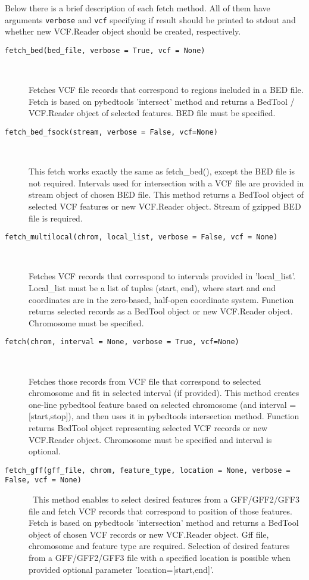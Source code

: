 \noindent Below there is a brief description of each fetch method.
All of them have arguments \verb|verbose| and \verb|vcf| specifying if result should be printed to stdout
and whether new VCF.Reader object should be created, respectively.

\begin{description}
  \item[\texttt{fetch\_bed(bed\_file, verbose = True, vcf = None)}] \

    Fetches VCF file records that correspond to regions included in a BED file.
    Fetch is based on pybedtools 'intersect' method and returns a BedTool / VCF.Reader object of selected features.
    BED file must be specified.

  \item[\texttt{fetch\_bed\_fsock(stream, verbose = False, vcf=None)}] \

    This fetch works exactly the same as fetch\_bed(), except the BED file is not required.
    Intervals used for intersection with a VCF file are provided in stream object of chosen BED file.
    This method returns a BedTool object of selected VCF features or new VCF.Reader object.
    Stream of gzipped BED file is required.

  \item[\texttt{fetch\_multilocal(chrom, local\_list, verbose = False, vcf = None)}] \

    Fetches VCF records that correspond to intervals provided in 'local\_list'.
    Local\_list must be a list of tuples (start, end), where start and end coordinates are in the
    zero-based, half-open coordinate system. Function returns selected records as a BedTool object
    or new VCF.Reader object. Chromosome must be specified.

  \item[\texttt{fetch(chrom, interval = None, verbose = True, vcf=None)}] \

    Fetches those records from VCF file that correspond to selected chromosome and
    fit in selected interval (if provided).
    This method creates one-line pybedtool feature based on selected chromosome (and interval = [start,stop]),
    and then uses it in pybedtools intersection method.
    Function returns BedTool object representing selected VCF records or new VCF.Reader object.
    Chromosome must be specified and interval is optional.

  \item[\texttt{fetch\_gff(gff\_file, chrom, feature\_type, location = None, verbose = False, vcf = None)}] \
    This method enables to select desired features from a GFF/GFF2/GFF3 file and fetch VCF records
    that correspond to position of those features. Fetch is based on pybedtools 'intersection' method and returns
    a BedTool object of chosen VCF records or new VCF.Reader object.
    Gff file, chromosome and feature type are required.
    Selection of desired features from a GFF/GFF2/GFF3 file with a specified location is possible when
    provided optional parameter 'location=[start,end]'.


\end{description}
